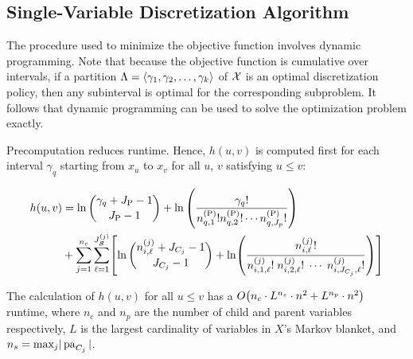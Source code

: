 

\subsection{Single-Variable Discretization Algorithm}
\label{subsec:algo}

The procedure used to minimize the objective function involves dynamic programming.
Note that because the objective function is cumulative over intervals, if a partition $\Lambda = \langle \gamma_1, \gamma_2, \ldots, \gamma_k \rangle$ of $\mathcal{X}$ is an optimal discretization policy, then any subinterval is optimal for the corresponding subproblem.
It follows that dynamic programming can be used to solve the optimization problem exactly.

Precomputation reduces runtime.
Hence, $h(u,v)$ is computed first for each interval $\gamma_q$ starting from $x_{u}$ to $x_{v}$ for all $u$, $v$ satisfying $u \leq v$:

\begin{small}
  \begin{equation}
  \label{eqn:h_function}
  \begin{aligned}
  h(u,v) &=  \ln {{\gamma_{q} + J_\text{P} - 1}\choose{J_\text{P}-1}} + \ln \left( { {{\gamma_q}!}\over{ {n^{(\text{P})}_{q,1} !} {n^{(\text{P})}_{q,2} !} \cdots {n^{(\text{P})}_{q,J_p} !}} } \right) \\
  & + \sum_{j=1}^{n_c} \sum_{\ell=1}^{J^{(j)}_{\bm{S}}} \brock{
    { \ln
            {{n^{(j)}_{i,\ell} + J_{C_j} - 1}\choose{J_{C_j}-1}}}
      +
      \ln \paren{ {
            \frac{
              {n^{(j)}_{i,\ell}}!
            }{
              {n^{(j)}_{i,1,\ell}!} \; {n^{(j)}_{i,2,\ell}!} \; \cdots \; {n^{(j)}_{i,J_{C_j},\ell}!}
            }
          }
          } }
  \end{aligned}
  \end{equation}
\end{small}

The calculation of $h(u,v)$ for all $u \leq v$ has a $\bigo \paren{ n_c \cdot {L}^{n_s} \cdot n^2 + {L}^{n_p} \cdot n^2 }$ runtime, where $n_c$ and $n_p$ are the number of child and parent variables respectively, $L$ is the largest cardinality of variables in $X$'s Markov blanket, and $n_s = \text{max}_j  |\operatorname{pa}_{C_j}|$.

